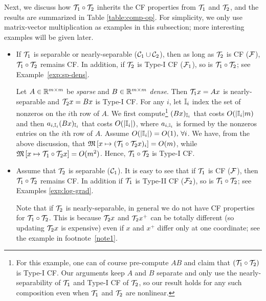 Next, we discuss how ${\mathcal{T}}_1\circ {\mathcal{T}}_2$ inherits the CF properties from ${\mathcal{T}}_1$ and ${\mathcal{T}}_2$, and the results are summarized in Table \ref{table:comp-op}. For simplicity, we only use matrix-vector multiplication as examples in this subsection; more interesting examples will be given later.%
\begin{itemize}

\item If ${\mathcal{T}}_1$ is separable or nearly-separable (${\mathcal{C}}_1\cup{\mathcal{C}}_2$), then as long as ${\mathcal{T}}_2$ is CF (${\mathcal{F}}$), ${\mathcal{T}}_1\circ{\mathcal{T}}_2$ remains CF. In addition, if ${\mathcal{T}}_2$ is Type-I CF (${\mathcal{F}}_1$), so is ${\mathcal{T}}_1\circ{\mathcal{T}}_2$; see Example~\ref{exp:sp-dens}. 
\begin{example}\label{exp:sp-dens}
Let $A\in\mathbb{R}^{m\times m}$ be \emph{sparse} and $B\in\mathbb{R}^{m\times m}$ \emph{dense}. Then ${\mathcal{T}}_1 x=Ax$ is nearly-separable and ${\mathcal{T}}_2 x=Bx$ is Type-I CF.  For any $i$, let $\mathbb{I}_i$ index the set of nonzeros on the $i$th row of $A$. We first compute\footnote{For this example, one can of course pre-compute $AB$ and claim that $({\mathcal{T}}_1\circ{\mathcal{T}}_2)$ is Type-I CF. Our arguments keep $A$ and $B$ separate and only use the nearly-separability of ${\mathcal{T}}_1$ and Type-I CF of ${\mathcal{T}}_2$, so our result holds for any such composition even when ${\mathcal{T}}_1$ and ${\mathcal{T}}_2$ are nonlinear.} $(Bx)_{\mathbb{I}_i}$ that costs $O(|\mathbb{I}_i|m)$ and then $a_{i,\mathbb{I}_i} (Bx)_{\mathbb{I}_i}$ that costs $O(|\mathbb{I}_i|)$, where $a_{i,\mathbb{I}_i}$ is formed by the nonzeros entries on the $i$th row of $A$. Assume $O(|\mathbb{I}_i|)=O(1),\,\forall i$. We have, from the above discussion, that $\mathfrak{M}\left[{x}\mapsto {({\mathcal{T}}_1\circ{\mathcal{T}}_2 x)_i}\right]=O(m)$,
while $\mathfrak{M}\left[{x}\mapsto {{\mathcal{T}}_1\circ{\mathcal{T}}_2 x}\right]=O(m^2)$. Hence, ${\mathcal{T}}_1\circ{\mathcal{T}}_2$ is Type-I CF.
\end{example}


\item Assume that ${\mathcal{T}}_2$ is separable (${\mathcal{C}}_1$). It is easy to see that if ${\mathcal{T}}_1$ is CF (${\mathcal{F}}$), then ${\mathcal{T}}_1\circ {\mathcal{T}}_2$ remains CF. In addition if ${\mathcal{T}}_1$ is Type-II CF (${\mathcal{F}}_2$), so is ${\mathcal{T}}_1\circ{\mathcal{T}}_2$; see Examples \ref{exp:log-grad}. %

Note that if ${\mathcal{T}}_2$ is nearly-separable, in general we do not have CF properties for ${\mathcal{T}}_1\circ{\mathcal{T}}_2$. This is because ${\mathcal{T}}_2 x$ and ${\mathcal{T}}_2 x^+$ can be totally different (so updating ${\mathcal{T}}_2 x$ is expensive) even if $x$ and $x^+$ differ only at one coordinate; see the example in footnote~\ref{note1}. %



\end{itemize}
